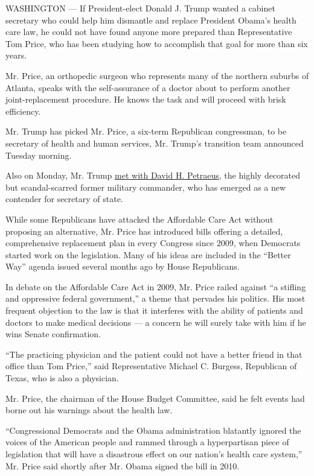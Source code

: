 WASHINGTON --- If President-elect Donald J. Trump wanted a cabinet
secretary who could help him dismantle and replace President Obama's
health care law, he could not have found anyone more prepared than
Representative Tom Price, who has been studying how to accomplish that
goal for more than six years.

Mr. Price, an orthopedic surgeon who represents many of the northern
suburbs of Atlanta, speaks with the self-assurance of a doctor about to
perform another joint-replacement procedure. He knows the task and will
proceed with brisk efficiency.

Mr. Trump has picked Mr. Price, a six-term Republican congressman, to be
secretary of health and human services, Mr. Trump's transition team
announced Tuesday morning.

Also on Monday, Mr. Trump
\href{http://www.nytimes.com/2016/11/28/us/politics/donald-trump-transition-david-petraeus.html}{met
with David H. Petraeus}, the highly decorated but scandal-scarred former
military commander, who has emerged as a new contender for secretary of
state.

While some Republicans have attacked the Affordable Care Act without
proposing an alternative, Mr. Price has introduced bills offering a
detailed, comprehensive replacement plan in every Congress since 2009,
when Democrats started work on the legislation. Many of his ideas are
included in the ``Better Way'' agenda issued several months ago by House
Republicans.

In debate on the Affordable Care Act in 2009, Mr. Price railed against
``a stifling and oppressive federal government,'' a theme that pervades
his politics. His most frequent objection to the law is that it
interferes with the ability of patients and doctors to make medical
decisions --- a concern he will surely take with him if he wins Senate
confirmation.

``The practicing physician and the patient could not have a better
friend in that office than Tom Price,'' said Representative Michael C.
Burgess, Republican of Texas, who is also a physician.

Mr. Price, the chairman of the House Budget Committee, said he felt
events had borne out his warnings about the health law.

``Congressional Democrats and the Obama administration blatantly ignored
the voices of the American people and rammed through a hyperpartisan
piece of legislation that will have a disastrous effect on our nation's
health care system,'' Mr. Price said shortly after Mr. Obama signed the
bill in 2010.

